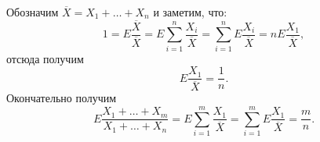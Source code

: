 \documentclass{article}
\begin{document}
Обозначим $\overline{X}=X_1 + \ldots + X_n$ и заметим, что:
$$1=E\frac{\overline{X}}{\overline{X}}=E\sum\limits_{i=1}^{n}\frac{X_i}{\overline{X}}=\sum\limits_{i=1}^{n}E\frac{X_i}{\overline{X}}=nE\frac{X_1}{\overline{X}},$$
отсюда получим
$$E\frac{X_1}{\overline{X}}=\frac{1}{n}.$$
Окончательно получим
$$E\frac{X_1 + \ldots + X_m}{X_1 + \ldots + X_n}=E\sum_{i=1}^{m}\frac{X_1}{\overline{X}}=\sum_{i=1}^{m}E\frac{X_1}{\overline{X}}=\frac{m}{n}.$$
\end{document}
